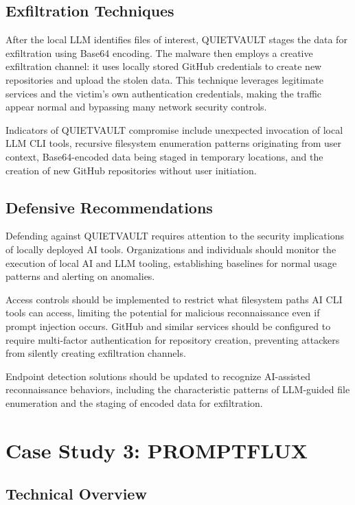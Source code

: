 \documentclass[12pt,a4paper]{article}
\begin{document}
\subsection{Exfiltration Techniques}

After the local LLM identifies files of interest, QUIETVAULT stages the data for exfiltration using Base64 encoding. The malware then employs a creative exfiltration channel: it uses locally stored GitHub credentials to create new repositories and upload the stolen data. This technique leverages legitimate services and the victim's own authentication credentials, making the traffic appear normal and bypassing many network security controls.

Indicators of QUIETVAULT compromise include unexpected invocation of local LLM CLI tools, recursive filesystem enumeration patterns originating from user context, Base64-encoded data being staged in temporary locations, and the creation of new GitHub repositories without user initiation.

\subsection{Defensive Recommendations}

Defending against QUIETVAULT requires attention to the security implications of locally deployed AI tools. Organizations and individuals should monitor the execution of local AI and LLM tooling, establishing baselines for normal usage patterns and alerting on anomalies.

Access controls should be implemented to restrict what filesystem paths AI CLI tools can access, limiting the potential for malicious reconnaissance even if prompt injection occurs. GitHub and similar services should be configured to require multi-factor authentication for repository creation, preventing attackers from silently creating exfiltration channels.

Endpoint detection solutions should be updated to recognize AI-assisted reconnaissance behaviors, including the characteristic patterns of LLM-guided file enumeration and the staging of encoded data for exfiltration.

\section{Case Study 3: PROMPTFLUX}

\subsection{Technical Overview}
\end{document}
